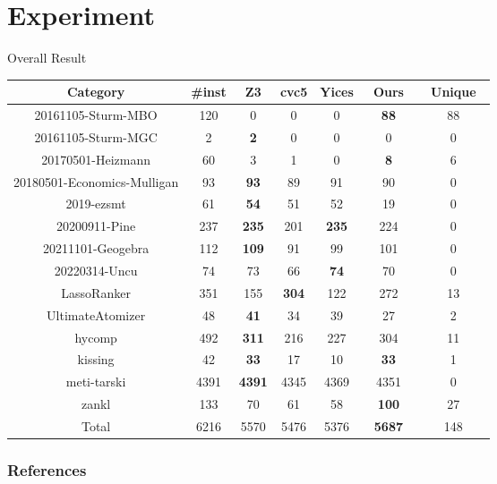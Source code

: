 \section{Experiment}
\begin{frame}{Overall Result}
    \begin{table}[!t]
        \centering
        \small
        \begin{tabular}{c | c | c | c | c | c | c}
                    Category & \#inst & Z3 & cvc5 & Yices & ~Ours~ & ~Unique~ \\ \hline
                    20161105-Sturm-MBO & 120 & 0 & 0 & 0 & \textbf{88} & 88 \\
                    20161105-Sturm-MGC & 2 & \textbf{2} & 0 & 0 & 0 & 0 \\
                    20170501-Heizmann & 60 & 3 & 1 & 0 & \textbf{8} & 6 \\
                    20180501-Economics-Mulligan & 93 & \textbf{93} & 89 & 91 & 90 & 0 \\
                    2019-ezsmt & 61 & \textbf{54} & 51 & 52 & 19 & 0 \\
                    20200911-Pine & 237 & \textbf{235} & 201 & \textbf{235} & 224 & 0 \\
                    20211101-Geogebra & 112 & \textbf{109} & 91 & 99 & 101 & 0 \\
                    20220314-Uncu & 74 & 73 & 66 & \textbf{74} & 70 & 0 \\
                    LassoRanker & 351 & 155 & \textbf{304} & 122 & 272 & 13\\
                    UltimateAtomizer & 48 & \textbf{41} & 34 & 39 & 27 & 2 \\
                    hycomp & 492 & \textbf{311} & 216 & 227 & 304 & 11 \\
                    kissing & 42 & \textbf{33} & 17 & 10 & \textbf{33} & 1 \\
                    meti-tarski & 4391 & \textbf{4391} & 4345 & 4369 & 4351 & 0 \\
                    zankl & 133 & 70 & 61 & 58 & \textbf{100} & 27 \\ \hline
                    Total & 6216 & 5570 & 5476 & 5376 & \textbf{5687} & 148 
                \end{tabular}
        \end{table}
\end{frame}

\begin{frame}
    \frametitle{References}
\printbibliography
\end{frame}